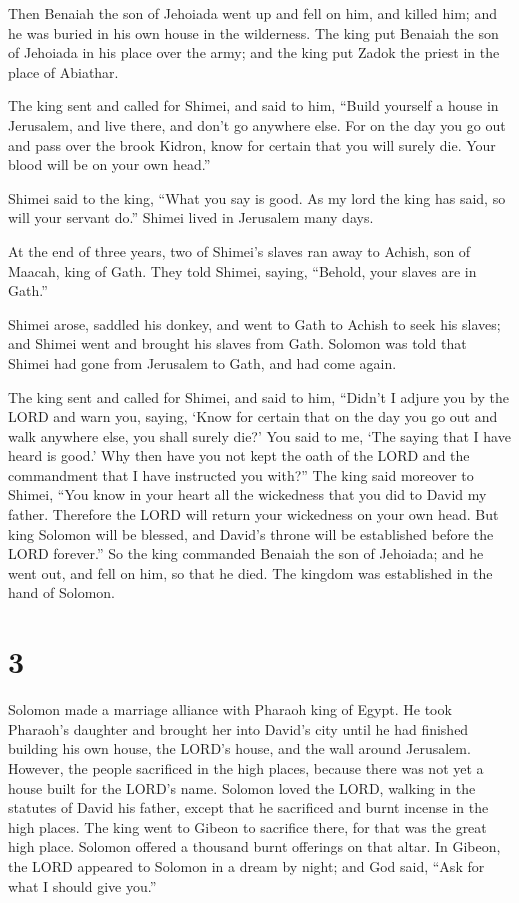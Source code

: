  Then Benaiah the son of Jehoiada went up and fell on
him, and killed him; and he was buried in his own house in the
wilderness.  The king put Benaiah the son of Jehoiada in
his place over the army; and the king put Zadok the priest in the place
of Abiathar.

 The king sent and called for Shimei, and said to him,
``Build yourself a house in Jerusalem, and live there, and don't go
anywhere else.  For on the day you go out and pass over
the brook Kidron, know for certain that you will surely die. Your blood
will be on your own head.''

 Shimei said to the king, ``What you say is good. As my
lord the king has said, so will your servant do.'' Shimei lived in
Jerusalem many days.

 At the end of three years, two of Shimei's slaves ran
away to Achish, son of Maacah, king of Gath. They told Shimei, saying,
``Behold, your slaves are in Gath.''

 Shimei arose, saddled his donkey, and went to Gath to
Achish to seek his slaves; and Shimei went and brought his slaves from
Gath.  Solomon was told that Shimei had gone from
Jerusalem to Gath, and had come again.

 The king sent and called for Shimei, and said to him,
``Didn't I adjure you by the LORD and warn you, saying, `Know for
certain that on the day you go out and walk anywhere else, you shall
surely die?' You said to me, `The saying that I have heard is good.'
 Why then have you not kept the oath of the LORD and the
commandment that I have instructed you with?''  The king
said moreover to Shimei, ``You know in your heart all the wickedness
that you did to David my father. Therefore the LORD will return your
wickedness on your own head.  But king Solomon will be
blessed, and David's throne will be established before the LORD
forever.''  So the king commanded Benaiah the son of
Jehoiada; and he went out, and fell on him, so that he died. The kingdom
was established in the hand of Solomon.

\hypertarget{section-2}{%
\section{3}\label{section-2}}

 Solomon made a marriage alliance with Pharaoh king of
Egypt. He took Pharaoh's daughter and brought her into David's city
until he had finished building his own house, the LORD's house, and the
wall around Jerusalem.  However, the people sacrificed in
the high places, because there was not yet a house built for the LORD's
name.  Solomon loved the LORD, walking in the statutes of
David his father, except that he sacrificed and burnt incense in the
high places.  The king went to Gibeon to sacrifice there,
for that was the great high place. Solomon offered a thousand burnt
offerings on that altar.  In Gibeon, the LORD appeared to
Solomon in a dream by night; and God said, ``Ask for what I should give
you.''

